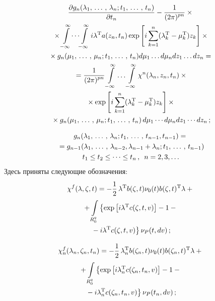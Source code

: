 \begin{multicols}{2}
    \vspace*{-12pt}

    \noindent
\begin{multline*}
 \displaystyle\frac{\displaystyle \partial g_n (\lambda_1,\,\ldots\,,\, \lambda_n; t_1,\,\ldots\,,\, t_n)\mathstrut}{\displaystyle \partial t_n\mathstrut} -
    \displaystyle\frac{\displaystyle 1\mathstrut}{\displaystyle (2\pi)^{pn}\mathstrut} \times{}\\
    {}\times \int\limits_{-\infty}^\infty\! \cdots \!\int\limits_{-\infty}^\infty i\lambda^{\mathrm{T}} a (z_n,t_n)
    \exp \left[ i \sum\limits_{k=1}^n (\lambda_k^{\mathrm{T}} - \mu_k^{\mathrm{T}}) z_k\right]\times{}\\
    {}\times g_n
    (\mu_1,\,\ldots\,,\, \mu_n; t_1,\,\ldots\,,\, t_n) d\mu_1 \ldots d \mu_n dz_1\ldots dz_n={}\\
{}= \displaystyle\frac{\displaystyle 1\mathstrut}{\displaystyle (2\pi)^{pn}\mathstrut} \int\limits_{-\infty}^\infty\ldots \int\limits_{-\infty}^\infty \chi^n (\lambda_n, z_n,t_n)\times{}\\
{}\times\exp \left[ i \sum\limits_{k=1}^n (\lambda_k^{\mathrm{T}} - \mu_k^{\mathrm{T}}) z_k\right] \times{}\\
{}\times g_n
     (\mu_1,\,\ldots\,,\, \mu_n; t_1,\,\ldots\,,\, t_n)\, d\mu_1 \cdots d \mu_n dz_1\cdots dz_n\,;
     \end{multline*}


\vspace*{-12pt}

    \noindent
\begin{multline*}
 g_n (\lambda_1,\,\ldots\,,\, \lambda_n; t_1,\,\ldots\,,\, t_{n-1},t_{n-1})={}\\
 {}=
    g_{n-1} (\lambda_1,\,\ldots\,,\, \lambda_{n-2},\lambda_{n-1}+\lambda_n; t_1,\,\ldots\,,\, t_{n-1})\\
t_1\le t_2 \le\cdots \le t_n\,, \enskip n=2,3,\ldots
    \end{multline*}
Здесь приняты следующие обозначения:
\begin{multline*}
    \chi^f (\lambda,\zeta, t) =-\displaystyle\frac{\displaystyle 1\mathstrut}{\displaystyle 2\mathstrut}\, \lambda^{\mathrm{T}}
    b(\zeta,t) \nu_0(t) b(\zeta,t)^{\mathrm{T}}\lambda +{}\\
{}+ \int\limits_{R_0^q}\left\{ \exp \left[ i\lambda^{\mathrm{T}} c(\zeta,t,v) \right]
    -1 -{}\right.\\
\left.    {}-i\lambda^{\mathrm{T}} c(\zeta, t,v)\right\} \nu_P (t,dv)\,;
    \end{multline*}

\vspace*{-14pt}

    \noindent
\begin{multline*}
    \chi^f_n (\lambda_n,\zeta_n, t_n) =-\displaystyle\frac{\displaystyle 1\mathstrut}{\displaystyle 2\mathstrut}\,
    \lambda^{\mathrm{T}}_n b(\zeta_n,t) \nu_0(t) b(\zeta_n,t)^{\mathrm{T}}\lambda +{}\\
{}+ \int\limits_{R_0^q} \left\{ \exp \left[ i\lambda^{\mathrm{T}}_n c(\zeta_n,t_n,v) \right] -
    1 -{}\right.\\
\left.    {}-i\lambda^{\mathrm{T}}_n c(\zeta_n, t_n,v)\right\} \nu_P (t_n,dv)\,;
    \end{multline*}


\end{multicols}

